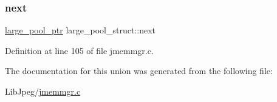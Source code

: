 \mbox{\label{unionlarge__pool__struct_af4e2c26179563b175cd134ace99767cf}} 
\subsubsection{\texorpdfstring{next}{next}}
{\footnotesize\ttfamily \mbox{\hyperlink{jmemmgr_8c_a048418eab2b2022aaa4ec587c48a3089}{large\+\_\+pool\+\_\+ptr}} large\+\_\+pool\+\_\+struct\+::next}



Definition at line 105 of file jmemmgr.\+c.



The documentation for this union was generated from the following file\+:\begin{DoxyCompactItemize}
\item 
Lib\+Jpeg/\mbox{\hyperlink{jmemmgr_8c}{jmemmgr.\+c}}\end{DoxyCompactItemize}
